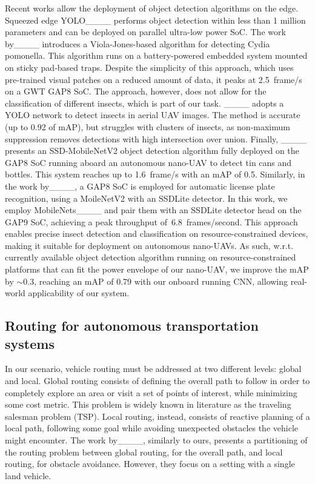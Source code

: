 Recent works allow the deployment of object detection algorithms on the edge.
Squeezed edge YOLO____ performs object detection within less than 1 million parameters and can be deployed on parallel ultra-low power SoC.
The work by____ introduces a Viola-Jones-based algorithm for detecting Cydia pomonella.
This algorithm runs on a battery-powered embedded system mounted on sticky pad-based traps.
Despite the simplicity of this approach, which uses pre-trained visual patches on a reduced amount of data, it peaks at \SI{2.5}{frame/\second} on a GWT GAP8 SoC. 
The approach, however, does not allow for the classification of different insects, which is part of our task.
____ adopts a YOLO network to detect insects in aerial UAV images. 
The method is accurate (up to 0.92 of mAP), but struggles with clusters of insects, as non-maximum suppression removes detections with high intersection over union.
Finally, ____ presents an SSD-MobileNetV2 object detection algorithm fully deployed on the GAP8 SoC running aboard an autonomous nano-UAV to detect tin cans and bottles.
This system reaches up to \SI{1.6}{frame/\second} with an mAP of 0.5.
Similarly, in the work by____, a GAP8 SoC is employed for automatic license plate recognition, using a MoileNetV2 with an SSDLite detector.
In this work, we employ MobileNets____ and pair them with an SSDLite detector head on the GAP9 SoC, achieving a peak throughput of~\SI{6.8}{frames/second}. 
This approach enables precise insect detection and classification on resource-constrained devices, making it suitable for deployment on autonomous nano-UAVs.
As such, w.r.t. currently available object detection algorithm running on resource-constrained platforms that can fit the power envelope of our nano-UAV, we improve the mAP by $\sim$0.3, reaching an mAP of 0.79 with our onboard running CNN, allowing real-world applicability of our system.

\subsection{Routing for autonomous transportation systems}

In our scenario, vehicle routing must be addressed at two different levels: global and local.  
Global routing consists of defining the overall path to follow in order to completely explore an area or visit a set of points of interest, while minimizing some cost metric. 
This problem is widely known in literature as the traveling salesman problem (TSP).  
Local routing, instead, consists of reactive planning of a local path, following some goal while avoiding unexpected obstacles the vehicle might encounter.  
The work by____, similarly to ours, presents a partitioning of the routing problem between global routing, for the overall path, and local routing, for obstacle avoidance. 
However, they focus on a setting with a single land vehicle.

